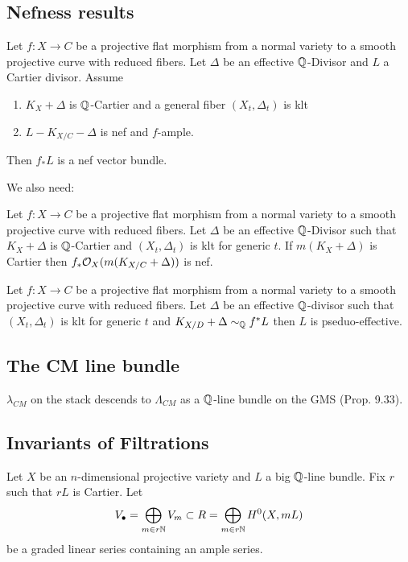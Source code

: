 \documentclass[12pt]{article}
\begin{document}
\subsection{Nefness results}

\begin{prop}
Let $f : X \to C$ be a projective flat morphism from a normal variety to a smooth projective curve with reduced fibers. Let $\Delta$ be an effective $\mathbb{Q}$-Divisor and $L$ a Cartier divisor. Assume
\begin{enumerate}
\item $K_X + \Delta$ is $\mathbb{Q}$-Cartier and a general fiber $(X_t, \Delta_t)$ is klt
\item $L - K_{X/C} - \Delta$ is nef and $f$-ample.
\end{enumerate}
Then $f_* L$ is a nef vector bundle.
\end{prop}

We also need:

\begin{prop}
Let $f : X \to C$ be a projective flat morphism from a normal variety to a smooth projective curve with reduced fibers. Let $\Delta$ be an effective $\mathbb{Q}$-Divisor such that $K_X + \Delta$ is $\mathbb{Q}$-Cartier and $(X_t, \Delta_t)$ is klt for generic $t$. If $m(K_X + \Delta)$ is Cartier then $f_* \mathcal{O}_{X}(m(K_{X/C} + \Delta))$ is nef. 
\end{prop}

\begin{prop}
Let $f : X \to C$ be a projective flat morphism from a normal variety to a smooth projective curve with reduced fibers. Let $\Delta$ be an effective $\mathbb{Q}$-divisor such that $(X_t, \Delta_t)$ is klt for generic $t$ and $K_{X/D} + \Delta \sim_{\mathbb{Q}} f^* L$ then $L$ is pseduo-effective.
\end{prop}

\subsection{The CM line bundle}

$\lambda_{CM}$ on the stack descends to $\Lambda_{CM}$ as a $\mathbb{Q}$-line bundle on the GMS (Prop. 9.33).

\subsection{Invariants of Filtrations}

Let $X$ be an $n$-dimensional projective variety and $L$ a big $\mathbb{Q}$-line bundle. Fix $r$ such that $r L$ is Cartier. Let
\[ V_\bullet = \bigoplus_{m \in r \mathbb{N}} V_m \subset R = \bigoplus_{m \in r \mathbb{N}} H^0(X, m L) \]
be a graded linear series containing an ample series.
\end{document}
